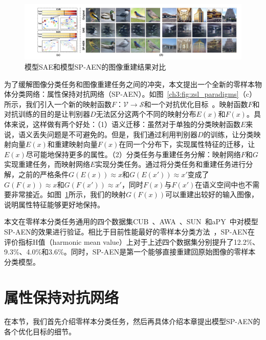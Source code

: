 \begin{figure}[h]
    \centering
        \includegraphics[width=\linewidth]{chapter3/res/reconstruction_visualization.pdf}
    \caption{模型SAE和模型SP-AEN的图像重建结果对比}
    \label{ch3:fig:reconstruction_visualization}
\end{figure}

为了缓解图像分类任务和图像重建任务之间的冲突，本文提出一个全新的零样本物体分类网络：属性保持对抗网络（SP-AEN）。如图~\ref{ch3:fig:zsl_paradigms}（c）所示，我们引入一个新的映射函数$F$：$\mathcal{V}\rightarrow \mathcal{S}$和一个对抗优化目标~\cite{goodfellow2014generative}。映射函数$F$和对抗训练的目的是让判别器$D$无法区分这两个不同的映射分布$E(x)$和$F(x)$。具体来说，这样做有两个好处：（1）语义迁移：虽然对于单独的分类映射函数$E$来说，语义丢失问题是不可避免的。但是，我们通过利用判别器$D$的训练，让分类映射向量$E(x)$和重建映射向量$F(x)$在同一个分布下，实现属性特征的迁移，让$E(x)$尽可能地保持更多的属性。（2）分类任务与重建任务分解：映射网络$F$和$G$实现重建任务，而映射网络$E$实现分类任务。通过将分类任务和重建任务进行分解，之前的严格条件$G(E(x)) \approx x$和$G(E(x')) \approx x'$变成了$G(F(x))\approx x$和$G(F(x'))\approx x'$，同时$F(x)$与$F(x')$在语义空间中也不需要非常接近。如图~\ref{ch3:fig:reconstruction_visualization}所示，我们的映射$G(F(x))$可以重建出较好的输入图像，说明属性特征能够更好地保持。

本文在零样本分类任务通用的四个数据集CUB~\cite{wah2011caltech}、AWA~\cite{lampert2009learning}、SUN~\cite{patterson2012sun}和aPY~\cite{farhadi2009describing}中对模型SP-AEN的效果进行验证。相比于目前性能最好的零样本分类方法~\cite{xian2017zero}，SP-AEN在评价指标H值（harmonic mean value）上对于上述四个数据集分别提升了12.2\%、9.3\%、4.0\%和3.6\%。同时，SP-AEN是第一个能够直接重建回原始图像的零样本分类模型。


\section{属性保持对抗网络}

在本节，我们首先介绍零样本分类任务，然后再具体介绍本章提出模型SP-AEN的各个优化目标的细节。

